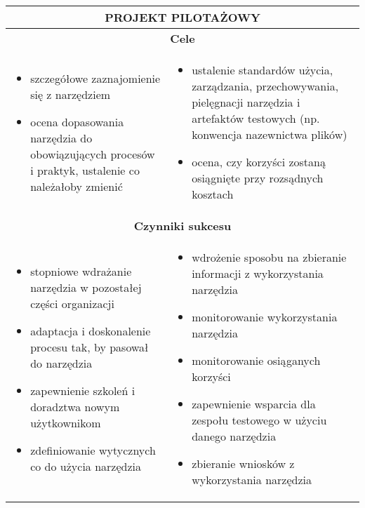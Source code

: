 \documentclass[../main.tex]{subfiles}
\begin{document}
    \begin{table}[H]
        \begin{center}
            \begin{tabular}{| p{8cm} | p{8cm} |}
                \hline
                \multicolumn{2}{|c|}{\textbf{PROJEKT PILOTAŻOWY}} \\
                \hline
                \hline
                \multicolumn{2}{|c|}{\textbf{Cele}} \\
                \hline
                \begin{itemize}
                    \item szczegółowe zaznajomienie się z narzędziem
                    \item ocena dopasowania narzędzia do obowiązujących procesów i praktyk, ustalenie co należałoby zmienić
                \end{itemize}
                &
                \begin{itemize}
                    \item ustalenie standardów użycia, zarządzania, przechowywania, pielęgnacji narzędzia i artefaktów testowych (np. konwencja nazewnictwa plików)
                    \item ocena, czy korzyści zostaną osiągnięte przy rozsądnych kosztach
                \end{itemize} \\
                \hline
                \hline
                \multicolumn{2}{|c|}{\textbf{Czynniki sukcesu}} \\
                \hline
                \begin{itemize}
                    \item stopniowe wdrażanie narzędzia w pozostałej części organizacji
                    \item adaptacja i doskonalenie procesu tak, by pasował do narzędzia
                    \item zapewnienie szkoleń i doradztwa nowym użytkownikom
                    \item zdefiniowanie wytycznych co do użycia narzędzia
                \end{itemize}
                &
                \begin{itemize}
                    \item wdrożenie sposobu na zbieranie informacji z wykorzystania narzędzia
                    \item monitorowanie wykorzystania narzędzia
                    \item monitorowanie osiąganych korzyści
                    \item zapewnienie wsparcia dla zespołu testowego w użyciu danego narzędzia
                    \item zbieranie wniosków z wykorzystania narzędzia
                \end{itemize} \\
                \hline
            \end{tabular}
        \end{center}
    \end{table}
\end{document}

